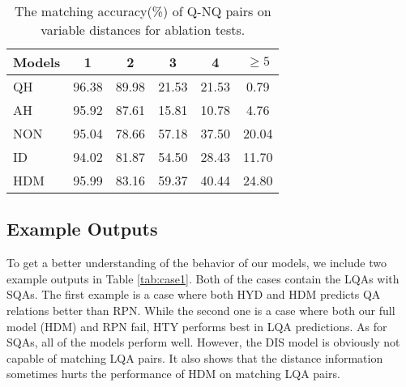 \documentclass[11pt,a4paper]{article}
\begin{document}
\begin{CJK}{UTF8}{gbsn}
\begin{table}[h]
	\small
	\centering
	\begin{tabular}{p{1.5cm}<{\centering}ccccc}
		\toprule[1.3pt]
		Models &1&2&3&4&$\geq5$\\
		\midrule[1pt]
		QH&96.38&89.98&21.53&21.53&0.79\\
		AH&95.92&87.61&15.81&10.78&4.76\\
		\hline
		NON&95.04&78.66&57.18&37.50&20.04\\
		ID&94.02&81.87&54.50&28.43&11.70\\
		\hline
		HDM &95.99&83.16&59.37&40.44&24.80\\
		\bottomrule[1.3pt]
	\end{tabular}
	\caption{The matching accuracy(\%) of Q-NQ pairs on variable distances for ablation tests.}
	\label{tab:app2}
\end{table}

\subsection{Example Outputs}

To get a better understanding of the behavior of our models, we include two example outputs in Table \ref{tab:case1}. Both of the cases contain the LQAs with SQAs. The first example is a case where both HYD and HDM predicts QA relations better than RPN. While the second one is a case where both our full model (HDM) and RPN fail, HTY performs best in LQA predictions. As for SQAs, all of the models perform well. However, the DIS model is obviously not capable of matching LQA pairs. It also shows that the distance information sometimes hurts the performance of HDM on matching LQA pairs.



\end{CJK}
\end{document}

